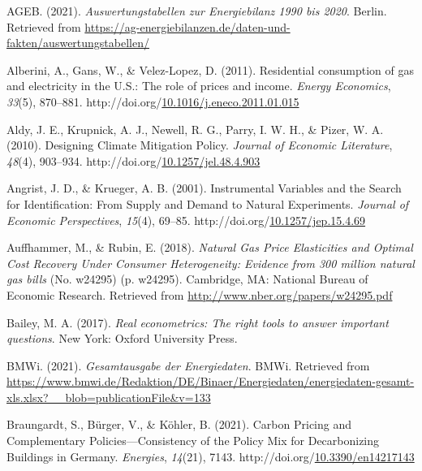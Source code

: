 \documentclass[12pt,twoside]{reedthesis}
\newlength{\cslhangindent}
\newenvironment{CSLReferences}[2] %
 {%
  \setlength{\parindent}{0pt}
  \ifodd #1 \everypar{\setlength{\hangindent}{\cslhangindent}}\ignorespaces\fi
  \ifnum #2 > 0
  \setlength{\parskip}{#2\baselineskip}
  \fi
 }%
 {}
\begin{document}
\hypertarget{refs}{}
\begin{CSLReferences}{1}{0}
\leavevmode{}%
AGEB. (2021). \emph{Auswertungstabellen zur Energiebilanz 1990 bis 2020}. Berlin. Retrieved from \url{https://ag-energiebilanzen.de/daten-und-fakten/auswertungstabellen/}

\leavevmode{}%
Alberini, A., Gans, W., \& Velez-Lopez, D. (2011). Residential consumption of gas and electricity in the U.S.: The role of prices and income. \emph{Energy Economics}, \emph{33}(5), 870--881. http://doi.org/\href{https://doi.org/10.1016/j.eneco.2011.01.015}{10.1016/j.eneco.2011.01.015}

\leavevmode{}%
Aldy, J. E., Krupnick, A. J., Newell, R. G., Parry, I. W. H., \& Pizer, W. A. (2010). Designing Climate Mitigation Policy. \emph{Journal of Economic Literature}, \emph{48}(4), 903--934. http://doi.org/\href{https://doi.org/10.1257/jel.48.4.903}{10.1257/jel.48.4.903}

\leavevmode{}%
Angrist, J. D., \& Krueger, A. B. (2001). Instrumental Variables and the Search for Identification: From Supply and Demand to Natural Experiments. \emph{Journal of Economic Perspectives}, \emph{15}(4), 69--85. http://doi.org/\href{https://doi.org/10.1257/jep.15.4.69}{10.1257/jep.15.4.69}

\leavevmode{}%
Auffhammer, M., \& Rubin, E. (2018). \emph{Natural Gas Price Elasticities and Optimal Cost Recovery Under Consumer Heterogeneity: Evidence from 300 million natural gas bills} (No. w24295) (p. w24295). Cambridge, MA: National Bureau of Economic Research. Retrieved from \url{http://www.nber.org/papers/w24295.pdf}

\leavevmode{}%
Bailey, M. A. (2017). \emph{Real econometrics: The right tools to answer important questions}. New York: Oxford University Press.

\leavevmode{}%
BMWi. (2021). \emph{Gesamtausgabe der Energiedaten}. BMWi. Retrieved from \url{https://www.bmwi.de/Redaktion/DE/Binaer/Energiedaten/energiedaten-gesamt-xls.xlsx?__blob=publicationFile\&v=133}

\leavevmode{}%
Braungardt, S., Bürger, V., \& Köhler, B. (2021). Carbon Pricing and Complementary Policies---Consistency of the Policy Mix for Decarbonizing Buildings in Germany. \emph{Energies}, \emph{14}(21), 7143. http://doi.org/\href{https://doi.org/10.3390/en14217143}{10.3390/en14217143}


\end{CSLReferences}
\end{document}
